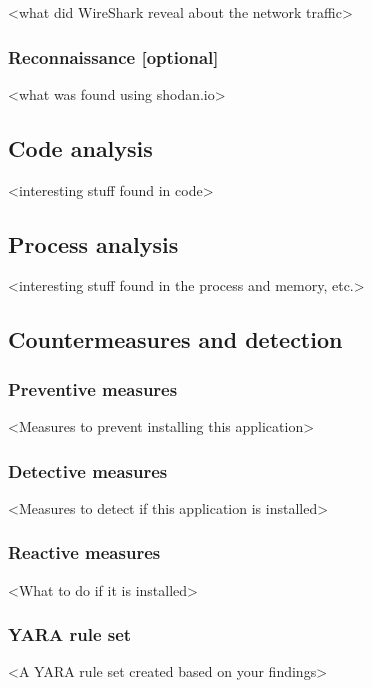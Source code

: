 <what did WireShark reveal about the network traffic>

\subsubsection{Reconnaissance [optional]}

<what was found using shodan.io>

\newpage
\subsection{Code analysis}

<interesting stuff found in code>

\newpage
\subsection{Process analysis}

<interesting stuff found in the process and memory, etc.>

\newpage
\subsection{Countermeasures and detection}

\subsubsection{Preventive measures}


<Measures to prevent installing this application>

\subsubsection{Detective measures}

<Measures to detect if this application is installed>

\subsubsection{Reactive measures}

<What to do if it is installed>

\subsubsection{YARA rule set}

<A YARA rule set created based on your findings>
